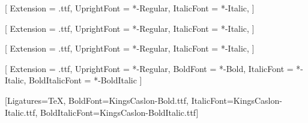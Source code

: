 \usepackage{fontspec}

[
Extension       =   .ttf,
UprightFont     =   *-Regular,
ItalicFont      =   *-Italic,
]  

[
Extension       =   .ttf,
UprightFont     =   *-Regular,
ItalicFont      =   *-Italic,
]

[
Extension       =   .ttf,
UprightFont     =   *-Regular,
ItalicFont      =   *-Italic,
]

[
Extension       =   .ttf,
UprightFont     =   *-Regular,
BoldFont        =   *-Bold,
ItalicFont      =   *-Italic,
BoldItalicFont  =   *-BoldItalic
]





\setsansfont{KingsCaslon-Regular.ttf}%
  [Ligatures=TeX,
  BoldFont=KingsCaslon-Bold.ttf,
  ItalicFont=KingsCaslon-Italic.ttf,
  BoldItalicFont=KingsCaslon-BoldItalic.ttf]
